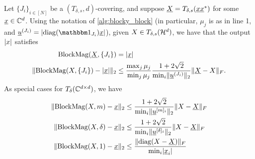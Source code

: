 \begin{proposition} \label{prop:blocky_block}
  Let $\{J_i\}_{i \in [N]}$ be a $(T_{\delta, s}, d)$-covering, and suppose $\underline{X} = T_{\delta, s}(\underline{x} \underline{x}^*)$ for some $\underline{x} \in \mathbb{C}^d$.  Using the notation of \cref{alg:blocky_block} (in particular, $\mu_j$ is as in line 1, and $\uu^{(J_i)} = \abs{\diag(\one_{J_i}) \ux}$), given $X \in T_{\delta, s}(\mathcal{H}^d)$, we have that the output $\lvert x\rvert$ satisfies
  \begin{equation}
  \begin{aligned}
    \operatorname{BlockMag}(\underline{X}, \{J_i\}) &= \lvert\underline{x}\rvert \\
    \lVert\operatorname{BlockMag}(X, \{J_i\}) - \lvert\underline{x}\rvert\rVert_2 &\le \dfrac{\max_j \mu_j}{\min_j \mu_j} \dfrac{1 + 2 \sqrt{2}}{\min_i \lVert\underline{u}^{(J_i)}\rVert_2} \lVert\underline{X} - X\rVert_F.
  \end{aligned}
  \label{eq:blocky_rec}
  \end{equation}
  As special cases for $T_\delta(\mathbb{C}^{d \times d})$, we have
  \begin{equation}
    \begin{aligned}
      \lVert\operatorname{BlockMag}(X, m) - \underline{x}\rVert_2 &\le \dfrac{1 + 2 \sqrt{2}}{\min_i \lVert\underline{u}^{[m]_i}\rVert_2} \lVert X - \underline{X}\rVert_F \\
      \lVert\operatorname{BlockMag}(X, \delta) - \underline{x}\rVert_2 &\le \dfrac{1 + 2 \sqrt{2}}{\min_i \lVert\underline{u}^{[\delta]_i}\rVert_2} \lVert X - \underline{X}\rVert_F \\
      \lVert\operatorname{BlockMag}(X, 1) - \underline{x}\rVert_2 &\le \dfrac{\lVert\operatorname{diag}(X - \underline{X})\rVert_F}{\min_i \lvert\underline{x}_i\rvert} 
    \end{aligned}
    \label{eq:blocky_spec}
  \end{equation}
\end{proposition}

